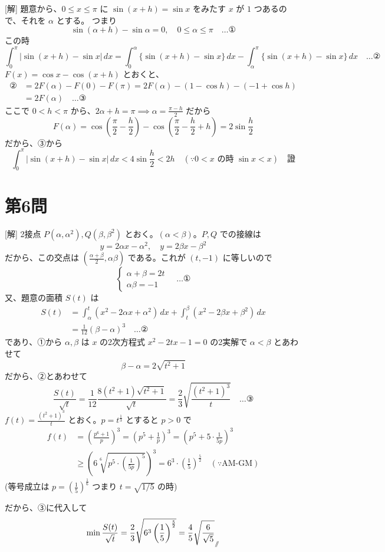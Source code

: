 \documentclass[../main.tex]{subfiles}
\begin{document}
[解] 題意から、$0 \le x \le \pi$ に $\sin(x+h) = \sin x$ をみたす $x$ が $1$ つあるので、それを $\alpha$ とする。
つまり
\[
  \sin(\alpha+h) - \sin\alpha = 0, \quad 0 \le \alpha \le \pi \quad \dots \text{①}
\]
この時
\[
  \int_0^\pi |\sin(x+h) - \sin x| \, dx = \int_0^\alpha \{ \sin(x+h) - \sin x \} \, dx - \int_\alpha^\pi \{ \sin(x+h) - \sin x \} \, dx \quad \dots \text{②}
\]
$F(x) = \cos x - \cos(x+h)$ とおくと、
\begin{align*}
  \text{②} &= 2F(\alpha) - F(0) - F(\pi) = 2F(\alpha) - (1 - \cos h) - (-1 + \cos h) \\
  &= 2F(\alpha) \quad \dots \text{③}
\end{align*}
ここで $0 < h < \pi$ から、$2\alpha + h = \pi \implies \alpha = \frac{\pi - h}{2}$ だから
\[
  F(\alpha) = \cos\left(\frac{\pi}{2} - \frac{h}{2}\right) - \cos\left(\frac{\pi}{2} - \frac{h}{2} + h\right) = 2\sin\frac{h}{2}
\]
だから、③から
\[
  \int_0^\pi |\sin(x+h) - \sin x| \, dx < 4\sin\frac{h}{2} < 2h \quad (\because 0 < x \text{ の時 } \sin x < x) \quad \text{證}
\]

\section*{第6問}

[解] 2接点 $P(\alpha, \alpha^2), Q(\beta, \beta^2)$ とおく。$(\alpha < \beta)$。$P, Q$ での接線は
\[
  y = 2\alpha x - \alpha^2, \quad y = 2\beta x - \beta^2
\]
だから、この交点は $\left( \frac{\alpha+\beta}{2}, \alpha\beta \right)$ である。これが $(t, -1)$ に等しいので
\[
  \begin{cases}
    \alpha + \beta = 2t \\
    \alpha\beta = -1
  \end{cases}
  \quad \dots \text{①}
\]
又、題意の面積 $S(t)$ は
\begin{align*}
  S(t) &= \int_\alpha^t (x^2 - 2\alpha x + \alpha^2) \, dx + \int_t^\beta (x^2 - 2\beta x + \beta^2) \, dx \\
  &= \frac{1}{12} (\beta - \alpha)^3 \quad \dots \text{②}
\end{align*}
であり、①から $\alpha, \beta$ は $x$ の2次方程式 $x^2 - 2tx - 1 = 0$ の2実解で $\alpha < \beta$ とあわせて
\[
  \beta - \alpha = 2\sqrt{t^2 + 1}
\]
だから、②とあわせて
\[
  \frac{S(t)}{\sqrt{t}} = \frac{1}{12} \frac{8(t^2+1)\sqrt{t^2+1}}{\sqrt{t}} = \frac{2}{3} \sqrt{ \frac{(t^2+1)^3}{t} } \quad \dots \text{③}
\]
$f(t) = \frac{(t^2+1)^3}{t}$ とおく。$p = t^{\frac{1}{3}}$ とすると $p > 0$ で
\begin{align*}
  f(t) &= \left( \frac{p^6+1}{p} \right)^3 = \left( p^5 + \frac{1}{p} \right)^3 = \left( p^5 + 5 \cdot \frac{1}{5p} \right)^3 \\
  &\ge \left( 6 \sqrt[6]{ p^5 \cdot \left(\frac{1}{5p}\right)^5 } \right)^3 = 6^3 \cdot \left(\frac{1}{5}\right)^{\frac{5}{2}} \quad (\because \text{AM-GM})
\end{align*}
(等号成立は $p = \left(\frac{1}{5}\right)^{\frac{1}{6}}$ つまり $t = \sqrt{1/5}$ の時)

だから、③に代入して
\[
  \min \frac{S(t)}{\sqrt{t}} = \frac{2}{3} \sqrt{ 6^3 \left(\frac{1}{5}\right)^{\frac{5}{2}} } = \frac{4}{5} \sqrt{\frac{6}{\sqrt{5}}}_{\mathbin{/\mkern-6mu/}}
\]
\end{document}

